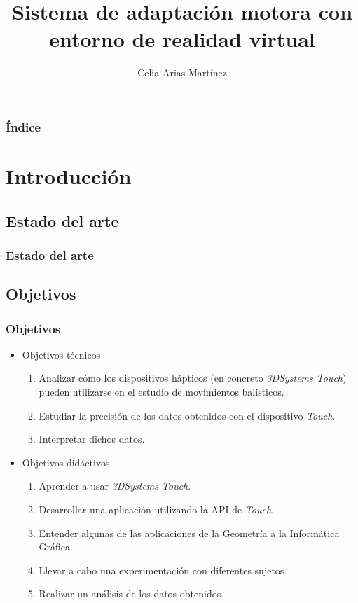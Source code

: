 \documentclass{beamer}
\title{Sistema de adaptación motora con entorno de realidad virtual}
\author{Celia Arias Martínez}
\begin{document}
\begin{frame}[plain]
    \maketitle
\end{frame}



\begin{frame}{}
	\frametitle{Índice}
	\tableofcontents
\end{frame}


\section{Introducción}
\subsection{Estado del arte}

\begin{frame}
	\frametitle{Estado del arte}

\end{frame}
\subsection{Objetivos}

\begin{frame}
\frametitle{Objetivos}
\begin{itemize}
	\item Objetivos técnicos
	\begin{enumerate}
		\item Analizar cómo los dispositivos hápticos (en concreto \textit{3DSystems Touch}) pueden utilizarse en el estudio de movimientos balísticos.
		\item Estudiar la precisión de los datos obtenidos con el dispositivo \textit{Touch}.
		\item Interpretar dichos datos.
	\end{enumerate}
	\item Objetivos didáctivos
	\begin{enumerate}
		\item Aprender a usar \textit{3DSystems Touch}.
		\item Desarrollar una aplicación utilizando la API de \textit{Touch}.
		\item Entender algunas de las aplicaciones de la Geometría a la Informática Gráfica.
		\item Llevar a cabo una experimentación con diferentes sujetos.
		\item Realizar un análisis de los datos obtenidos.
	\end{enumerate}
\end{itemize}

\end{frame}
\end{document}
